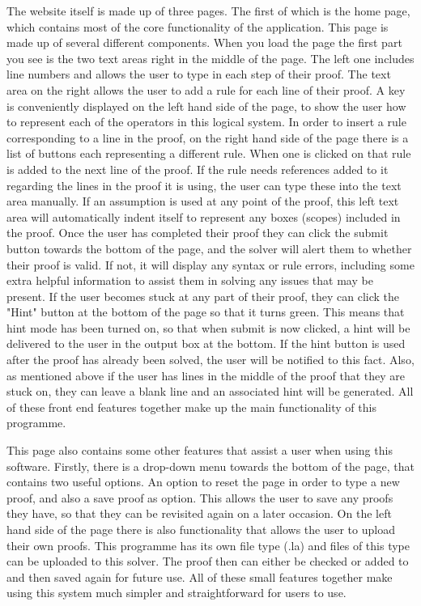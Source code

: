 The website itself is made up of three pages. The first of which is the home page, which contains most of the core functionality of the application. This page is made up of several different components. When you load the page the first part you see is the two text areas right in the middle of the page. The left one includes line numbers and allows the user to type in each step of their proof. The text area on the right allows the user to add a rule for each line of their proof. A key is conveniently displayed on the left hand side of the page, to show the user how to represent each of the operators in this logical system. In order to insert a rule corresponding to a line in the proof, on the right hand side of the page there is a list of buttons each representing a different rule. When one is clicked on that rule is added to the next line of the proof. If the rule needs references added to it regarding the lines in the proof it is using, the user can type these into the text area manually. If an assumption is used at any point of the proof, this left text area will automatically indent itself to represent any boxes (scopes) included in the proof. Once the user has completed their proof they can click the submit button towards the bottom of the page, and the solver will alert them to whether their proof is valid. If not, it will display any syntax or rule errors, including some extra helpful information to assist them in solving any issues that may be present. If the user becomes stuck at any part of their proof, they can click the "Hint" button at the bottom of the page so that it turns green. This means that hint mode has been turned on, so that when submit is now clicked, a hint will be delivered to the user in the output box at the bottom. If the hint button is used after the proof has already been solved, the user will be notified to this fact. Also, as mentioned above if the user has lines in the middle of the proof that they are stuck on, they can leave a blank line and an associated hint will be generated. All of these front end features together make up the main functionality of this programme.

This page also contains some other features that assist a user when using this software. Firstly, there is a drop-down menu towards the bottom of the page, that contains two useful options. An option to reset the page in order to type a new proof, and also a save proof as option. This allows the user to save any proofs they have, so that they can be revisited again on a later occasion. On the left hand side of the page there is also functionality that allows the user to upload their own proofs. This programme has its own file type (.la) and files of this type can be uploaded to this solver. The proof then can either be checked or added to and then saved again for future use. All of these small features together make using this system much simpler and straightforward for users to use.

